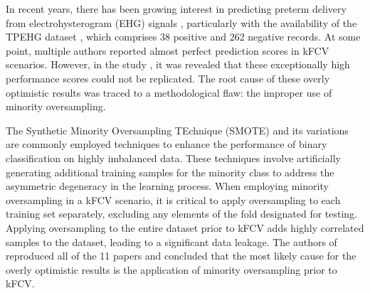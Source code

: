 \documentclass[5p, final]{elsarticle}
\begin{document}
In recent years, there has been growing interest in predicting preterm delivery from electrohysterogram (EHG) signals \cite{ehgreview}, particularly with the availability of the TPEHG dataset \cite{tpehg}, which comprises 38 positive and 262 negative records.
At some point, multiple authors reported almost perfect prediction scores in kFCV scenarios. However, in the study \cite{ehg}, it was revealed that these exceptionally high performance scores could not be replicated. The root cause of these overly optimistic results was traced to a methodological flaw: the improper use of minority oversampling.

The Synthetic Minority Oversampling TEchnique (SMOTE) \cite{smote} and its variations are commonly employed techniques to enhance the performance of binary classification on highly imbalanced data. These techniques involve artificially generating additional training samples for the minority class to address the asymmetric degeneracy in the learning process. When employing minority oversampling in a kFCV scenario, it is critical to apply oversampling to each training set separately, excluding any elements of the fold designated for testing. Applying oversampling to the entire dataset prior to kFCV adds highly correlated samples to the dataset, leading to a significant data leakage. The authors of \cite{ehg} reproduced all of the 11 papers and concluded that the most likely cause for the overly optimistic results is the application of minority oversampling prior to kFCV.
\end{document}
